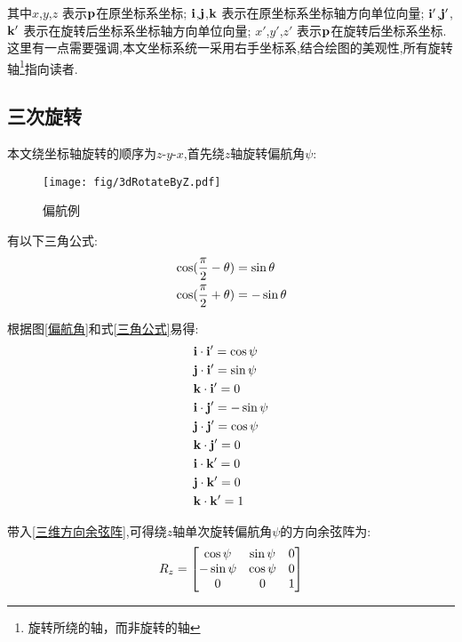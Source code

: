 其中$x$,$y$,$z$         表示$\mathbf{p}$在原坐标系坐标;
$\mathbf{i}$,$\mathbf{j}$,$\mathbf{k}$    表示在原坐标系坐标轴方向单位向量;
$\mathbf{i}'$,$\mathbf{j}'$,$\mathbf{k}'$ 表示在旋转后坐标系坐标轴方向单位向量;
$x'$,$y'$,$z'$          表示$\mathbf{p}$在旋转后坐标系坐标. 这里有一点需要强调,本文坐标系统一采用\textcolor[rgb]{1,0,0}{右手坐标系},结合绘图的美观性,所有旋转轴\footnote{旋转所绕的轴，而非旋转的轴}指向读者.

\subsection{三次旋转}
本文绕坐标轴旋转的顺序为$z$-$y$-$x$,首先绕$z$轴旋转偏航角$\psi$:
\begin{figure}[!hbp]
    \begin{center}
        \texttt{[image: fig/3dRotateByZ.pdf]}
        \caption{偏航例}\label{偏航例}
    \end{center}
\end{figure}

有以下三角公式:
\begin{equation}\label{三角公式}
    \begin{split}
        & \cos(\frac{\pi}{2}-\theta)=\sin\theta \\
        & \cos(\frac{\pi}{2}+\theta)=-\sin\theta
    \end{split}
\end{equation} 

根据图\ref{偏航角}和式\ref{三角公式}易得:
\begin{equation}\label{基向量运算}
    \begin{split}
        & \mathbf{i} \cdot \mathbf{i}'=\cos{\psi} \\
        & \mathbf{j} \cdot \mathbf{i}'=\sin{\psi} \\
        & \mathbf{k} \cdot \mathbf{i}'=0 \\
        & \mathbf{i} \cdot \mathbf{j}'=-\sin{\psi} \\
        & \mathbf{j} \cdot \mathbf{j}'=\cos{\psi} \\
        & \mathbf{k} \cdot \mathbf{j}'=0 \\
        & \mathbf{i} \cdot \mathbf{k}'=0 \\
        & \mathbf{j} \cdot \mathbf{k}'=0 \\
        & \mathbf{k} \cdot \mathbf{k}'=1
    \end{split}
\end{equation} 

带入\ref{三维方向余弦阵},可得绕$z$轴单次旋转偏航角$\psi$的方向余弦阵为:
\begin{equation}\label{偏航单次旋转方向余弦阵}
    \begin{split}
        R_z=
        \left[\begin{matrix}
                \cos{\psi} & \sin{\psi} & 0 \\
               -\sin{\psi} & \cos{\psi} & 0 \\
                0       &     0   & 1
        \end{matrix}\right]
    \end{split}
\end{equation}

